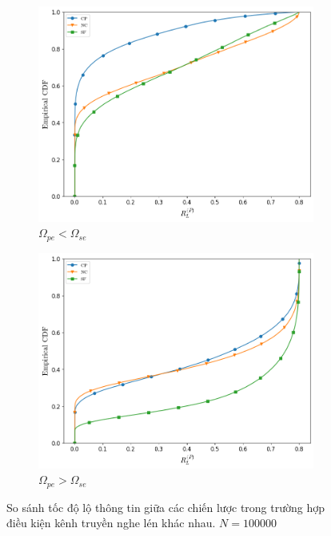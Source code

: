 \documentclass[../main.tex]{subfiles}
\begin{document}
\begin{figure}
\centering
\captionsetup{justification=centering}

\begin{subfigure}{.8\textwidth}
\centering
\captionsetup{justification=centering}
\includegraphics[width=1\linewidth]{Figures/compare-channel-good.png}
\caption{$\Omega_{pe} < \Omega_{se}$}
\label{fig:Channel:Good}
\end{subfigure}

\begin{subfigure}{.8\textwidth}
\centering
\includegraphics[width=1\linewidth]{Figures/compare-channel-bad.png}
\caption{$\Omega_{pe} > \Omega_{se}$}
\label{fig:Channel:Bad}
\end{subfigure}

\caption{So sánh tốc độ lộ thông tin giữa các chiến lược trong trường hợp điều kiện kênh truyền nghe lén khác nhau. $N=100000$}
\end{figure}
\end{document}
